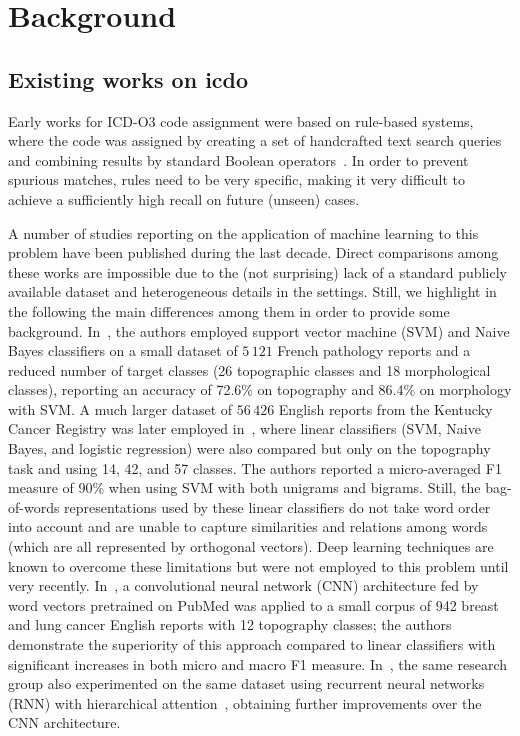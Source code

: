 \chapter{Background}
\label{ch:background}

\section{Existing works on \ac{icdo}}
Early works for ICD-O3 code assignment were based on rule-based
systems, where the code was assigned by creating a set of handcrafted
text search queries and combining results by standard Boolean
operators~\cite{crocetti_automatic_2004}. In order to prevent spurious
matches, rules need to be very specific, making it very difficult to
achieve a sufficiently high recall on future (unseen) cases.

A number of studies reporting on the application of machine learning
to this problem have been published during the last decade. Direct
comparisons among these works are impossible due to the (not
surprising) lack of a standard publicly available dataset and
heterogeneous details in the settings. Still, we highlight in the
following the main differences among them in order to provide some
background. In~\cite{jouhet_automated_2011}, the authors employed
support vector machine (SVM) and Naive Bayes classifiers on a small
dataset of $5\,121$ French pathology reports and a reduced number of
target classes (26 topographic classes and 18 morphological classes),
reporting an accuracy of 72.6\% on topography and 86.4\% on morphology
with SVM. A much larger dataset of $56\,426$ English reports from the
Kentucky Cancer Registry was later employed
in~\cite{kavuluru_automatic_2013}, where linear classifiers (SVM,
Naive Bayes, and logistic regression) were also compared but only on
the topography task and using 14, 42, and 57 classes. The authors
reported a micro-averaged F1 measure of 90\% when using SVM with both
unigrams and bigrams. Still, the bag-of-words representations used by
these linear classifiers do not take word order into account and are
unable to capture similarities and relations among words (which are
all represented by orthogonal vectors). Deep learning techniques are
known to overcome these limitations but were not employed to this
problem until very recently. In~\cite{qiu_deep_2018}, a convolutional
neural network (CNN) architecture fed by word vectors pretrained on
PubMed was applied to a small corpus of 942 breast and lung cancer
English reports with 12 topography classes; the authors demonstrate
the superiority of this approach compared to linear classifiers with
significant increases in both micro and macro F1
measure. In~\cite{gao_hierarchical_2018}, the same research group also
experimented on the same dataset using recurrent neural networks (RNN)
with hierarchical attention~\cite{yang_hierarchical_2016}, obtaining
further improvements over the CNN architecture.


